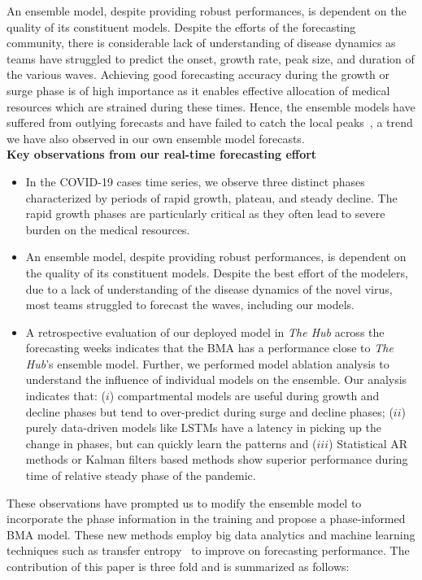 \documentclass[conference,compsoc]{IEEEtran}
\newcommand{\hub}{\emph{The Hub}}
\begin{document}
 An ensemble model, despite providing robust performances, is dependent on the quality of its constituent models. Despite the efforts of the forecasting community, there is considerable lack of understanding of disease dynamics as teams have struggled to predict the onset, growth rate, peak size, and duration of the various waves. Achieving good forecasting accuracy during the growth or surge phase is of high importance as it enables effective allocation of medical resources which are strained during these times. Hence, the ensemble models have suffered from outlying forecasts and have failed to catch the local peaks~\cite{ray2021challenges}, a trend we have also observed in our own ensemble model forecasts. 
 \\
\textbf{Key observations from our real-time forecasting effort}
\begin{itemize}
    \item In the COVID-19 cases time series, we observe three distinct phases characterized by periods of rapid growth, plateau, and steady decline. The rapid growth phases are particularly critical as they often lead to severe burden on the medical resources.
    \item An ensemble model, despite providing robust performances, is dependent on the quality of its constituent models. Despite the best effort of the modelers, due to a lack of understanding of the disease dynamics of the novel virus, most teams struggled to forecast the waves, including our models. 
    \item A retrospective evaluation of our deployed model \cite{allmodels} in \hub{} across the forecasting weeks indicates that the BMA has a performance close to \hub's ensemble model. Further, we performed model ablation analysis to understand the influence of individual models on the ensemble. Our analysis indicates that: ($i$) compartmental models are useful during growth and decline phases but tend to over-predict during surge and decline phases; ($ii$) purely data-driven models like LSTMs have a latency in picking up the change in phases, but can quickly learn the patterns and ($iii$) Statistical AR methods or Kalman filters based methods show superior performance during time of relative steady phase of the pandemic.
    
\end{itemize}

These observations have prompted us to modify the ensemble model to incorporate the phase information in the training and propose a phase-informed BMA model. These new methods employ big data analytics and machine learning techniques such as transfer entropy~\cite{schreiber2000measuring} to improve on forecasting performance. The contribution of this paper is three fold and is summarized as follows:
\end{document}
